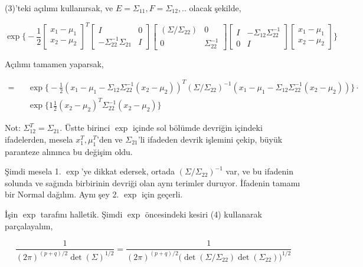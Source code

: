 \documentclass[12pt,fleqn]{article}\usepackage{../../common}
\begin{document}
(3)'teki açılımı kullanırsak, ve $E = \Sigma_{11},F=\Sigma_{12},..$ olacak şekilde,

$$
\exp 
\bigg\{ 
-\frac{ 1}{2}
\left[\begin{array}{r}
x_1 - \mu_1\\
x_2 - \mu_2
\end{array}\right]^T
\left[\begin{array}{rr}
I & 0 \\ 
-\Sigma_{22}^{-1}\Sigma_{21} & I
\end{array}\right]
\left[\begin{array}{rr}
(\Sigma/\Sigma_{22}) & 0 \\ 
0 & \Sigma_{22}^{-1} 
\end{array}\right]
\left[\begin{array}{rr}
I & -\Sigma_{12}\Sigma_{22}^{-1}  \\ 
0 & I
\end{array}\right]
\left[\begin{array}{r}
x_1 - \mu_1\\
x_2 - \mu_2
\end{array}\right]
\bigg\}
$$

Açılımı tamamen yaparsak, 

$$ 
 \begin{array}{lll}
= && \exp \bigg\{
-\frac{1 }{2} 
(x_1 - \mu_1 - \Sigma_{12}\Sigma_{22}^{-1} (x_2 - \mu_2))^T 
(\Sigma/\Sigma_{22})^{-1} 
(x_1 - \mu_1 - \Sigma_{12}\Sigma_{22}^{-1} (x_2 - \mu_2))
\bigg\} \cdot \\
&& \exp \bigg\{
1\frac{ 1}{2}(x_2-\mu_2)^T\Sigma_{22}^{-1} (x_2-\mu_2)
 \bigg\}
\end{array}
$$

Not: $\Sigma_{12}^T = \Sigma_{21}$. Üstte birinci $\exp$ içinde sol bölümde
devriğin içindeki ifadelerden, mesela $x_1^T,\mu_1^T$'den ve $\Sigma_{21}$'li
ifadeden devrik işlemini çekip, büyük paranteze alınınca bu değişim oldu.

Şimdi mesela 1. $\exp$'ye dikkat edersek, ortada $(\Sigma/\Sigma_{22})^{-1}$
var, ve bu ifadenin solunda ve sağında birbirinin devriği olan aynı terimler
duruyor. İfadenin tamamı bir Normal dağılım. Aynı şey 2. $\exp$ için geçerli.

İşin $\exp$ tarafını halletik. Şimdi $\exp$ öncesindeki kesiri (4) kullanarak
parçalayalım, 

$$ 
\frac{ 1}{(2\pi)^{(p+q)/2} \det(\Sigma)^{1/2}}  = 
\frac{ 1}{(2\pi)^{(p+q)/2} \bigg(\det(\Sigma/\Sigma_{22})\det(\Sigma_{22})\bigg)^{1/2}} 
$$
\end{document}

